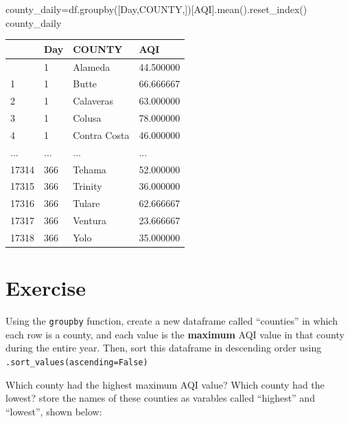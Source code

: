 \documentclass[
  letterpaper,
  DIV=11,
  numbers=noendperiod]{scrreprt}
\newenvironment{Shaded}{\begin{snugshade}}{\end{snugshade}}
\newcommand{\NormalTok}[1]{\textcolor[rgb]{0.00,0.23,0.31}{#1}}
\newcommand{\OperatorTok}[1]{\textcolor[rgb]{0.37,0.37,0.37}{#1}}
\newcommand{\StringTok}[1]{\textcolor[rgb]{0.13,0.47,0.30}{#1}}
\begin{document}
\begin{Shaded}
\begin{Highlighting}[]
\NormalTok{county\_daily}\OperatorTok{=}\NormalTok{df.groupby([}\StringTok{\textquotesingle{}Day\textquotesingle{}}\NormalTok{,}\StringTok{\textquotesingle{}COUNTY\textquotesingle{}}\NormalTok{,])[}\StringTok{\textquotesingle{}AQI\textquotesingle{}}\NormalTok{].mean().reset\_index()}
\NormalTok{county\_daily}
\end{Highlighting}
\end{Shaded}

\begin{longtable}[]{@{}llll@{}}
\toprule\noalign{}
& Day & COUNTY & AQI \\
\midrule\noalign{}
\endhead
\bottomrule\noalign{}
\endlastfoot
0 & 1 & Alameda & 44.500000 \\
1 & 1 & Butte & 66.666667 \\
2 & 1 & Calaveras & 63.000000 \\
3 & 1 & Colusa & 78.000000 \\
4 & 1 & Contra Costa & 46.000000 \\
... & ... & ... & ... \\
17314 & 366 & Tehama & 52.000000 \\
17315 & 366 & Trinity & 36.000000 \\
17316 & 366 & Tulare & 62.666667 \\
17317 & 366 & Ventura & 23.666667 \\
17318 & 366 & Yolo & 35.000000 \\
\end{longtable}

\hypertarget{exercise-5}{%
\section{Exercise}\label{exercise-5}}

Using the \texttt{groupby} function, create a new dataframe called
``counties'' in which each row is a county, and each value is the
\textbf{maximum} AQI value in that county during the entire year. Then,
sort this dataframe in descending order using
\texttt{.sort\_values(ascending=False)}

Which county had the highest maximum AQI value? Which county had the
lowest? store the names of these counties as varables called ``highest''
and ``lowest'', shown below:
\end{document}
